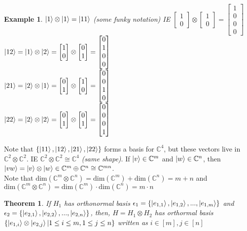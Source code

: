 \documentclass[12pt]{article}
\theoremstyle{plain}
\newtheorem{theorem}[lemma]{Theorem}
\theoremstyle{nonumberplain}
\theoremstyle{plain}
\newtheorem{example}[lemma]{Example}
\theoremstyle{nonumberplain}
\newcommand\1{{\bf 1}}
\newcommand{\bmat}[1]{\begin{bmatrix*} #1 \end{bmatrix*}} %
\newcommand{\C}{\mathbb{C}} %
\newcommand{\<}{\left\langle}
\renewcommand{\>}{\right\rangle}
\begin{document}
\begin{example}
$\ket{1}\otimes\ket{1}=\ket{11}$ (some funky notation)
IE $\bmat{1 \\ 0}\otimes\bmat{1 \\ 0}=\bmat{1 \\ 0 \\ 0 \\ 0}$ \\
$\ket{12}=\ket{1}\otimes\ket{2}=\bmat{1 \\ 0}\otimes\bmat{0 \\ 1}=\bmat{0 \\ 1 \\ 0 \\ 0}$ \\
$\ket{21}=\ket{2}\otimes\ket{1}=\bmat{0 \\ 1}\otimes\bmat{1 \\ 0}=\bmat{0 \\ 0 \\ 1 \\ 0}$ \\
$\ket{22}=\ket{2}\otimes\ket{2}=\bmat{0 \\ 1}\otimes\bmat{0 \\ 1}=\bmat{0 \\ 0 \\ 0 \\ 1}$ \\
\end{example}
Note that $\left\lbrace\ket{11},\ket{12},\ket{21},\ket{22}\right\rbrace$ forms a basis for $\C^4$, but these vectors live in $\C^2\otimes\C^2$. IE $\C^2\otimes\C^2\cong\C^4$ \textit{(same shape)}. If $\ket{v}\in\C^m$ and $\ket{w}\in\C^n$, then $\ket{vw}=\ket{v}\otimes\ket{w}\in\C^m\oplus\C^n\cong\C^{mn}$. \\
Note that $\text{dim}\left(\C^m\otimes\C^n\right)=\text{dim}\left(\C^m\right) + \text{dim}\left(\C^n\right)=m+n$ and $\text{dim}\left(\C^m\otimes\C^n\right)=\text{dim}\left(\C^m\right) \cdot \text{dim}\left(\C^n\right)=m\cdot n$

\begin{theorem}
If $H_1$ has orthonormal basis $\epsilon_1=\lbrace\ket{e_{1,1}},\ket{e_{1,2}},...,\ket{e_{1,m}}\rbrace$ and $\epsilon_2=\lbrace\ket{e_{2,1}},\ket{e_{2,2}},...,\ket{e_{2,n}}\rbrace$, then, $H=H_1\otimes H_2$ has orthormal basis $\lbrace\ket{e_{1,i}}\otimes\ket{e_{2,j}}\vert 1\leq i \leq m, 1 \leq j \leq n\rbrace$ written as $i\in \left[ m \right],j\in \left[ n \right] $
\end{theorem}
\end{document}
